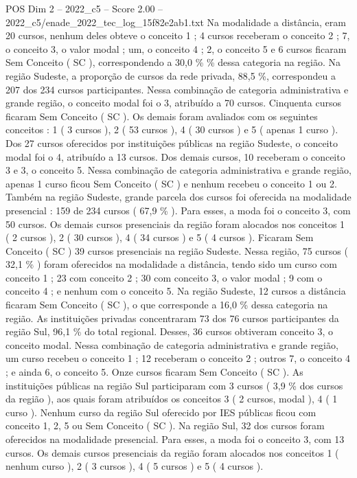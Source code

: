 \begin{textsample}{POS Dim 2 – 2022\_c5 – Score 2.00 – 2022\_c5/enade\_2022\_tec\_log\_15f82e2ab1.txt}
Na modalidade a distância, eram 20 cursos, nenhum deles obteve o conceito 1 ; 4 cursos receberam o conceito 2 ; 7, o conceito 3, o valor modal ; um, o conceito 4 ; 2, o conceito 5 e 6 cursos ficaram Sem Conceito ( SC ), correspondendo a 30,0 \% \% dessa categoria na região.
Na região Sudeste, a proporção de cursos da rede privada, 88,5 \%, correspondeu a 207 dos 234 cursos participantes.
Nessa combinação de categoria administrativa e grande região, o conceito modal foi o 3, atribuído a 70 cursos.
Cinquenta cursos ficaram Sem Conceito ( SC ).
Os demais foram avaliados com os seguintes conceitos : 1 ( 3 cursos ), 2 ( 53 cursos ), 4 ( 30 cursos ) e 5 ( apenas 1 curso ).
Dos 27 cursos oferecidos por instituições públicas na região Sudeste, o conceito modal foi o 4, atribuído a 13 cursos.
Dos demais cursos, 10 receberam o conceito 3 e 3, o conceito 5.
Nessa combinação de categoria administrativa e grande região, apenas 1 curso ficou Sem Conceito ( SC ) e nenhum recebeu o conceito 1 ou 2.
Também na região Sudeste, grande parcela dos cursos foi oferecida na modalidade presencial : 159 de 234 cursos ( 67,9 \% ).
Para esses, a moda foi o conceito 3, com 50 cursos.
Os demais cursos presenciais da região foram alocados nos conceitos 1 ( 2 cursos ), 2 ( 30 cursos ), 4 ( 34 cursos ) e 5 ( 4 cursos ).
Ficaram Sem Conceito ( SC ) 39 cursos presenciais na região Sudeste.
Nessa região, 75 cursos ( 32,1 \% ) foram oferecidos na modalidade a distância, tendo sido um curso com conceito 1 ; 23 com conceito 2 ; 30 com conceito 3, o valor modal ; 9 com o conceito 4 ; e nenhum com o conceito 5.
Na região Sudeste, 12 cursos a distância ficaram Sem Conceito ( SC ), o que corresponde a 16,0 \% dessa categoria na região.
As instituições privadas concentraram 73 dos 76 cursos participantes da região Sul, 96,1 \% do total regional.
Desses, 36 cursos obtiveram conceito 3, o conceito modal.
Nessa combinação de categoria administrativa e grande região, um curso recebeu o conceito 1 ; 12 receberam o conceito 2 ; outros 7, o conceito 4 ; e ainda 6, o conceito 5.
Onze cursos ficaram Sem Conceito ( SC ).
As instituições públicas na região Sul participaram com 3 cursos ( 3,9 \% dos cursos da região ), aos quais foram atribuídos os conceitos 3 ( 2 cursos, modal ), 4 ( 1 curso ).
Nenhum curso da região Sul oferecido por IES públicas ficou com conceito 1, 2, 5 ou Sem Conceito ( SC ).
Na região Sul, 32 dos cursos foram oferecidos na modalidade presencial.
Para esses, a moda foi o conceito 3, com 13 cursos.
Os demais cursos presenciais da região foram alocados nos conceitos 1 ( nenhum curso ), 2 ( 3 cursos ), 4 ( 5 cursos ) e 5 ( 4 cursos ).

\end{textsample}
